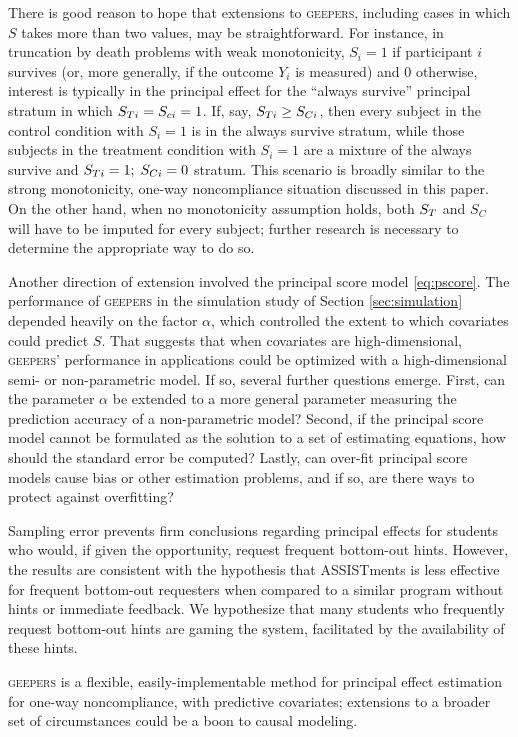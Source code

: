 \documentclass[]{article}
\begin{document}
There is good reason to hope that extensions to \textsc{geepers}, including cases in which $S$ takes more than two values, may be straightforward.
For instance, in truncation by death problems \citep[e.g.][]{zhangRubin,ding2011} with weak monotonicity, $S_i=1$ if participant $i$ survives (or, more generally, if the outcome $Y_i$ is measured) and 0 otherwise, interest is typically in the principal effect for the ``always survive'' principal stratum in which $S_{Ti}=S_{ci}=1$.
If, say, $S_{Ti}\ge S_{Ci}$, then every subject in the control condition with $S_i=1$ is in the always survive stratum, while those subjects in the treatment condition with $S_i=1$ are a mixture of the always survive and $S_{Ti}=1;\;S_{Ci}=0$ stratum.
This scenario is broadly similar to the strong monotonicity, one-way noncompliance situation discussed in this paper.
On the other hand, when no monotonicity assumption holds, both $S_T$ and $S_C$ will have to be imputed for every subject; further research is necessary to determine the appropriate way to do so.

Another direction of extension involved the principal score model \eqref{eq:pscore}.
The performance of \textsc{geepers} in the simulation study of Section \ref{sec:simulation} depended heavily on the factor $\alpha$, which controlled the extent to which covariates could predict $S$.
That suggests that when covariates are high-dimensional, \textsc{geepers}' performance in applications could be optimized with a high-dimensional semi- or non-parametric model.
If so, several further questions emerge.
First, can the parameter $\alpha$ be extended to a more general parameter measuring the prediction accuracy of a non-parametric model?
Second, if the principal score model cannot be formulated as the solution to a set of estimating equations, how should the standard error be computed?
Lastly, can over-fit principal score models cause bias or other estimation problems, and if so, are there ways to protect against overfitting?

Sampling error prevents firm conclusions regarding principal effects for students who would, if given the opportunity, request frequent bottom-out hints.
However, the results are consistent with the hypothesis that ASSISTments is less effective for frequent bottom-out requesters when compared to a similar program without hints or immediate feedback. We hypothesize that many students who frequently request bottom-out hints are gaming the system, facilitated by the availability of these hints.

\textsc{geepers} is a flexible, easily-implementable method for principal effect estimation for one-way noncompliance, with predictive covariates; extensions to a broader set of circumstances could be a boon to causal modeling.
\end{document}
